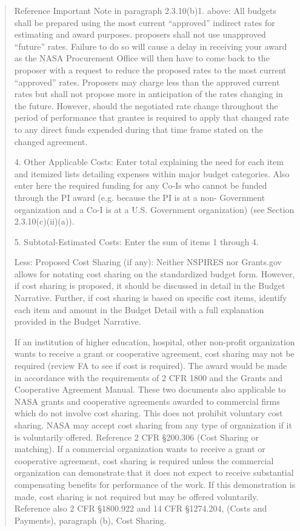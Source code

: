 \documentclass[12pt]{article}
\begin{document}
\begin{quote}
Reference Important Note in paragraph 2.3.10(b)1. above: All budgets
shall be prepared using the most current ``approved'' indirect rates for
estimating and award purposes. proposers shall not use unapproved
``future'' rates. Failure to do so will cause a delay in receiving your
award as the NASA Procurement Office will then have to come back to
the proposer with a request to reduce the proposed rates to the most
current ``approved'' rates. Proposers may charge less than the approved
current rates but shall not propose more in anticipation of the rates
changing in the future. However, should the negotiated rate change
throughout the period of performance that grantee is required to apply
that changed rate to any direct funds expended during that time frame
stated on the changed agreement.


4. Other Applicable Costs: Enter total explaining the need for each
   item and itemized lists detailing expenses within major budget
   categories. Also enter here the required funding for any Co-Is who
   cannot be funded through the PI award (e.g. because the PI is at a
   non- Government organization and a Co-I is at a U.S. Government
   organization) (see Section 2.3.10(c)(ii)(a)).

5. Subtotal-Estimated Costs: Enter the sum of items 1 through 4.

Less: Proposed Cost Sharing (if any): Neither NSPIRES nor Grants.gov
allows for notating cost sharing on the standardized budget
form. However, if cost sharing is proposed, it should be discussed in
detail in the Budget Narrative. Further, if cost sharing is based on
specific cost items, identify each item and amount in the Budget
Detail with a full explanation provided in the Budget Narrative.

If an institution of higher education, hospital, other non-profit
organization wants to receive a grant or cooperative agreement, cost
sharing may not be required (review FA to see if cost is
required). The award would be made in accordance with the requirements
of 2 CFR 1800 and the Grants and Cooperative Agreement Manual. These
two documents also applicable to NASA grants and cooperative
agreements awarded to commercial firms which do not involve cost
sharing. This does not prohibit voluntary cost sharing. NASA may
accept cost sharing from any type of organization if it is voluntarily
offered. Reference 2 CFR \S200.306 (Cost Sharing or matching). If a
commercial organization wants to receive a grant or cooperative
agreement, cost sharing is required unless the commercial organization
can demonstrate that it does not expect to receive substantial
compensating benefits for performance of the work. If this
demonstration is made, cost sharing is not required but may be offered
voluntarily. Reference also 2 CFR \S1800.922 and 14 CFR \S1274.204,
(Costs and Payments), paragraph (b), Cost Sharing.


\end{quote}
\end{document}
